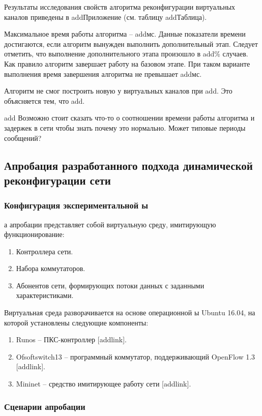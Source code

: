 \documentclass[12pt,fleqn]{article}
\begin{document}
Результаты исследования свойств алгоритма реконфигурации виртуальных каналов приведены в addПриложение (см. таблицу addТаблица).

Максимальное время работы алгоритма – addмс. Данные показатели времени достигаются, если алгоритм вынужден выполнить дополнительный этап. Следует отметить, что выполнение дополнительного этапа произошло в add\% случаев. Как правило алгоритм завершает работу на базовом этапе. При таком варианте выполнения время завершения алгоритма не превышает addмс.

Алгоритм не смог построить новую у виртуальных каналов при add. Это объясняется тем, что add.

add Возможно стоит сказать что-то о соотношении времени работы алгоритма и задержек в сети чтобы знать почему это нормально. Может типовые периоды сообщений?

\subsection{Апробация разработанного подхода динамической реконфигурации сети}
\subsubsection{Конфигурация экспериментальной ы}
 а апробации представляет собой виртуальную среду, имитирующую
функционирование:
\begin{enumerate}
	\item Контроллера сети.
	\item Набора коммутаторов.
	\item Абонентов сети, формирующих потоки данных с заданными характеристиками.
\end{enumerate}

Виртуальная среда разворачивается на основе операционной ы Ubuntu 16.04,
на которой установлены следующие компоненты:
\begin{enumerate}
	\item Runos -- ПКС-контроллер [addlink].
	\item Ofsoftswitch13 -- программный коммутатор, поддерживающий OpenFlow 1.3 [addlink].
	\item Mininet -- средство имитирующее работу сети [addlink].
\end{enumerate}

\subsubsection{Сценарии апробации}
\end{document}

